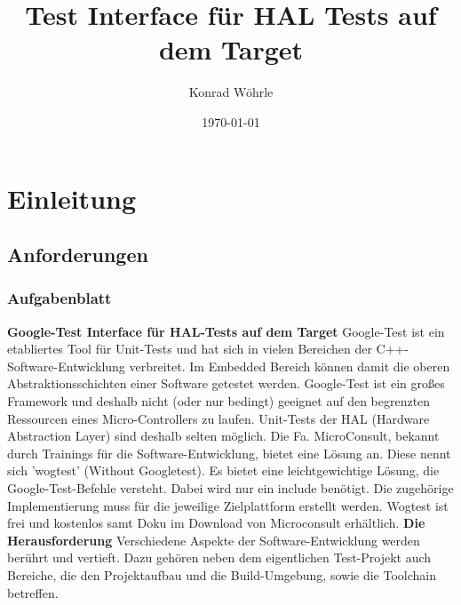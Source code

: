 \documentclass[12pt,a4paper]{article}
\title{Test Interface für HAL Tests auf dem Target}
\author{Konrad Wöhrle}
\date{\today}
\begin{document}
\maketitle
\tableofcontents
\newpage

\section{Einleitung}
\subsection{Anforderungen}
\subsubsection{Aufgabenblatt}
\textbf{Google-Test Interface für HAL-Tests auf dem Target}
\newline
Google-Test ist ein etabliertes Tool für Unit-Tests und hat sich in vielen Bereichen der C++-Software-Entwicklung verbreitet. Im Embedded Bereich können damit die oberen Abstraktionsschichten einer Software getestet werden. Google-Test ist ein großes Framework und deshalb nicht (oder nur bedingt) geeignet auf den begrenzten Ressourcen eines Micro-Controllers zu laufen. Unit-Tests der HAL (Hardware Abstraction Layer) sind deshalb selten möglich.
Die Fa. MicroConsult, bekannt durch Trainings für die Software-Entwicklung, bietet eine Lösung an. Diese nennt sich 'wogtest' (Without Googletest). Es bietet eine leichtgewichtige Lösung, die Google-Test-Befehle versteht. Dabei wird nur ein include benötigt. Die zugehörige Implementierung muss für die jeweilige Zielplattform erstellt werden.
Wogtest ist frei und kostenlos samt Doku im Download von Microconsult erhältlich.
\newline\newline
\textbf{Die Herausforderung}
\newline
Verschiedene Aspekte der Software-Entwicklung werden berührt und vertieft. Dazu gehören neben dem eigentlichen Test-Projekt auch Bereiche, die den Projektaufbau und die Build-Umgebung, sowie die Toolchain betreffen. 
\newline
\end{document}
